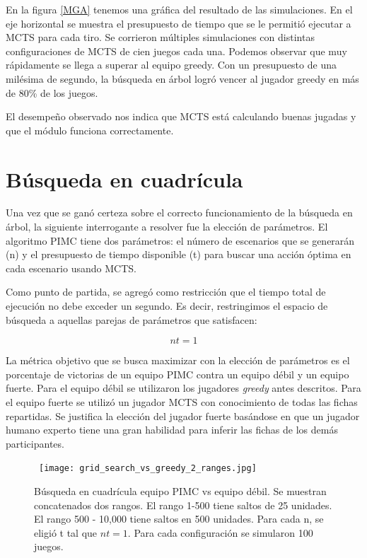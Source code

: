 En la figura \ref{MGA} tenemos una gráfica del resultado de las simulaciones. En
el eje horizontal se muestra el presupuesto de tiempo que se le permitió
ejecutar a MCTS para cada tiro. Se corrieron múltiples simulaciones con
distintas configuraciones de MCTS de cien juegos cada una. Podemos observar que
muy rápidamente se llega a superar al equipo greedy. Con un presupuesto de una
milésima de segundo, la búsqueda en árbol logró vencer al jugador greedy en más
de 80\% de los juegos.

El desempeño observado nos indica que MCTS está calculando buenas jugadas y que
el módulo funciona correctamente.


\section{Búsqueda en cuadrícula}
\label{sec:grid_search}

Una vez que se ganó certeza sobre el correcto funcionamiento de la búsqueda en
árbol, la siguiente interrogante a resolver fue la elección de parámetros. El
algoritmo PIMC tiene dos parámetros: el número de escenarios que se generarán
(n) y el presupuesto de tiempo disponible (t) para buscar una acción óptima en
cada escenario usando MCTS.

Como punto de partida, se agregó como restricción que el tiempo total de
ejecución no debe exceder un segundo. Es decir, restringimos el espacio de
búsqueda a aquellas parejas de parámetros que satisfacen:


\[nt = 1 \]

La métrica objetivo que se busca maximizar con la elección de parámetros es el
porcentaje de victorias de un equipo PIMC contra un equipo débil y un equipo
fuerte. Para el equipo débil se utilizaron los jugadores \textit{greedy} antes
descritos. Para el equipo fuerte se utilizó un jugador MCTS con conocimiento de
todas las fichas repartidas. Se justifica la elección del jugador fuerte
basándose en que un jugador humano experto tiene una gran habilidad para inferir
las fichas de los demás participantes.

\begin{figure}[H]
    \begin{center}
        \hbox{\hspace{-6.4em}
            \texttt{[image: grid\_search\_vs\_greedy\_2\_ranges.jpg]}}
        \caption{Búsqueda en cuadrícula equipo PIMC vs equipo débil. Se muestran
            concatenados dos rangos. El rango 1-500 tiene saltos de 25 unidades. El
            rango 500 - 10,000 tiene saltos en 500 unidades. Para cada n, se eligió
            t tal que \(nt = 1\). Para cada configuración se simularon 100 juegos.}
        \label{GSW}
    \end{center}
\end{figure}

